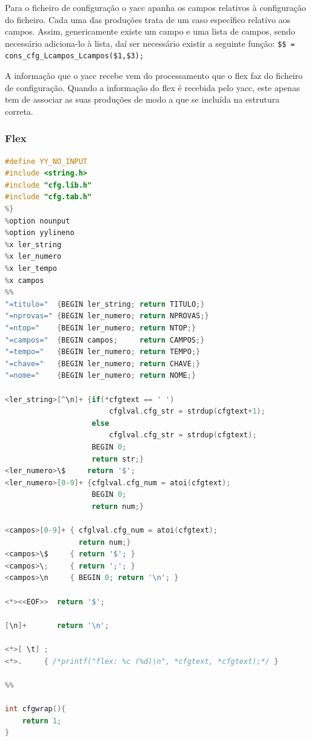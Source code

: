 \documentclass[11pt, a4paper, oneside]{article}
\begin{document}
Para o ficheiro de configuração o \textsf{yacc} apanha os campos relativos à configuração do ficheiro. Cada uma das produções trata de um caso específico relativo aos campos. Assim, genericamente existe um campo e uma lista de campos, sendo necessário adiciona-lo à lista, daí ser necessário existir a seguinte função: \texttt{\$\$ = cons\_cfg\_Lcampos\_Lcampos(\$1,\$3); }

A informação que o \textsf{yacc} recebe vem do processamento que o \textsf{flex} faz do ficheiro de configuração.
Quando a informação do \textsf{flex} é recebida pelo \textsf{yacc}, este apenas tem de associar as suas produções de modo a que se incluída na estrutura correta.

\newpage
\subsubsection{\textsf{Flex}}

\begin{lstlisting}[language=C, caption={flex utilizado para o tratamento do ficheiro de configuração.}] 
%{
#define YY_NO_INPUT
#include <string.h>
#include "cfg.lib.h"
#include "cfg.tab.h"
%}
%option nounput
%option yylineno
%x ler_string
%x ler_numero
%x ler_tempo
%x campos
%%
"=titulo="  {BEGIN ler_string; return TITULO;}
"=nprovas=" {BEGIN ler_numero; return NPROVAS;}
"=ntop="    {BEGIN ler_numero; return NTOP;}
"=campos="  {BEGIN campos;     return CAMPOS;}
"=tempo="   {BEGIN ler_numero; return TEMPO;}
"=chave="   {BEGIN ler_numero; return CHAVE;}
"=nome="    {BEGIN ler_numero; return NOME;}

<ler_string>[^\n]+ {if(*cfgtext == ' ')
                        cfglval.cfg_str = strdup(cfgtext+1);
                    else
                        cfglval.cfg_str = strdup(cfgtext);
                    BEGIN 0;
                    return str;}
<ler_numero>\$     return '$';
<ler_numero>[0-9]+ {cfglval.cfg_num = atoi(cfgtext);
                    BEGIN 0;
                    return num;}

<campos>[0-9]+ { cfglval.cfg_num = atoi(cfgtext);
                 return num;}
<campos>\$     { return '$'; }
<campos>\;     { return ';'; }
<campos>\n     { BEGIN 0; return '\n'; }

<*><<EOF>>  return '$';

[\n]+       return '\n';

<*>[ \t] ;
<*>.     { /*printf("flex: %c (%d)\n", *cfgtext, *cfgtext);*/ }

%%

int cfgwrap(){
    return 1;
}
\end{lstlisting}
\end{document}
